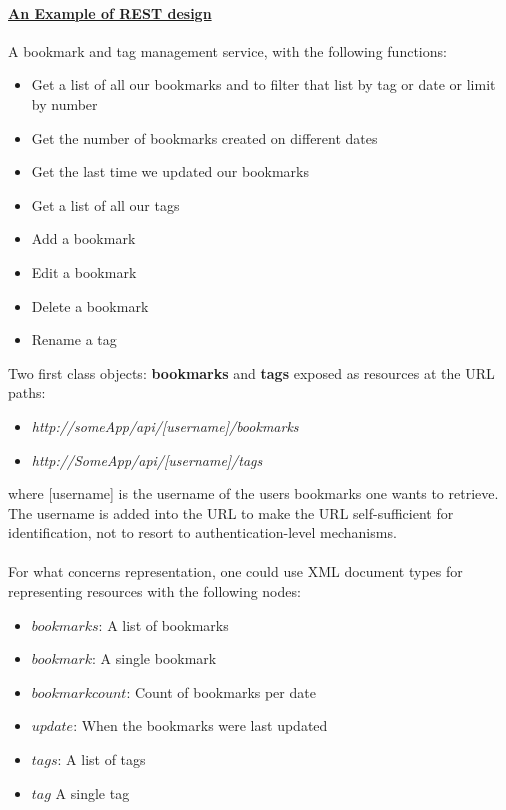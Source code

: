 \documentclass[10pt,a4paper]{article}
\newcommand{\nline}{\\~\\}
\begin{document}
 \paragraph{\uline{An Example of REST design}}
 A bookmark and tag management service, with the following functions:
 \begin{itemize}
 	\item Get a list of all our bookmarks and to filter that list by tag or date or limit by number
   \item Get the number of bookmarks created on different dates 
   \item Get the last time we updated our bookmarks
   \item Get a list of all our tags
	\item Add a bookmark
	\item Edit a bookmark 
	\item Delete a bookmark 
	\item Rename a tag
 \end{itemize}
 Two first class objects: \textbf{bookmarks} and \textbf{tags} exposed as resources at the URL paths:
 \begin{itemize}
 	\item \textit{http://someApp/api/[username]/bookmarks} 
 	\item \textit{http://SomeApp/api/[username]/tags}
 \end{itemize}
 where [username] is the username of the users bookmarks one wants to retrieve. The username is added into the URL to make the URL self-sufficient for identification, not to resort to authentication-level mechanisms. \nline
 For what concerns representation, one could use XML document types for representing resources with the following nodes:
 \begin{itemize}
 	\item $bookmarks$: A list of bookmarks
  	\item $bookmark$: A single bookmark
	\item $bookmarkcount$: Count of bookmarks per date 
	\item $update$: When the bookmarks were last updated
	\item $tags$: A list of tags
	\item $tag$ A single tag
 \end{itemize}
 \pagebreak
\end{document}
